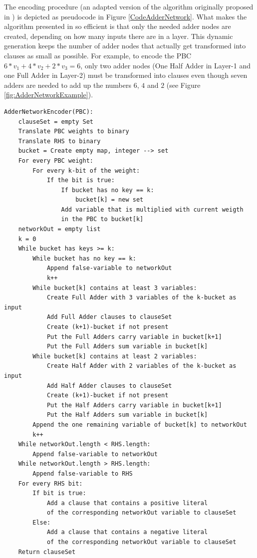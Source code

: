 The encoding procedure (an adapted version of the algorithm  originally proposed in \cite{Een2006TranslatingPC}) is depicted as pseudocode in Figure \ref{CodeAdderNetwork}. What makes the algorithm presented in \cite{Een2006TranslatingPC} so efficient is that only the needed adder nodes are created, depending on how many \true{} inputs there are in a layer. This dynamic generation keeps the number of adder nodes that actually get transformed into clauses as small as possible. For example, to encode the PBC $6*v_1+4*v_2+2*v_3=6$, only two adder nodes (One Half Adder in Layer-1 and one Full Adder in Layer-2) must be transformed into clauses even though seven adders are needed to add up the numbers $6$, $4$ and $2$ (see Figure \ref{fig:AdderNetworkExample}).

{
\pseudo{}
\renewcommand{\lstlistingname}{Algorithm}
\begin{lstlisting}[frame=single,caption={Pseudocode of PBC encoding using an Adder Network},captionpos=b, label=CodeAdderNetwork, basicstyle=\footnotesize]
AdderNetworkEncoder(PBC):
    clauseSet = empty Set
    Translate PBC weights to binary
    Translate RHS to binary
    bucket = Create empty map, integer --> set
    For every PBC weight:
        For every k-bit of the weight:
            If the bit is true:
                If bucket has no key == k:
                    bucket[k] = new set
                Add variable that is multiplied with current weigth 
                in the PBC to bucket[k]
    networkOut = empty list
    k = 0
    While bucket has keys >= k:
        While bucket has no key == k:
            Append false-variable to networkOut
            k++
        While bucket[k] contains at least 3 variables:
            Create Full Adder with 3 variables of the k-bucket as input
            Add Full Adder clauses to clauseSet
            Create (k+1)-bucket if not present
            Put the Full Adders carry variable in bucket[k+1]
            Put the Full Adders sum variable in bucket[k]
        While bucket[k] contains at least 2 variables:
            Create Half Adder with 2 variables of the k-bucket as input
            Add Half Adder clauses to clauseSet
            Create (k+1)-bucket if not present
            Put the Half Adders carry variable in bucket[k+1]
            Put the Half Adders sum variable in bucket[k]
        Append the one remaining variable of bucket[k] to networkOut
        k++
    While networkOut.length < RHS.length:
        Append false-variable to networkOut
    While networkOut.length > RHS.length:
        Append false-variable to RHS
    For every RHS bit:
        If bit is true:
            Add a clause that contains a positive literal
            of the corresponding networkOut variable to clauseSet
        Else:
            Add a clause that contains a negative literal
            of the corresponding networkOut variable to clauseSet
    Return clauseSet
\end{lstlisting}
}

